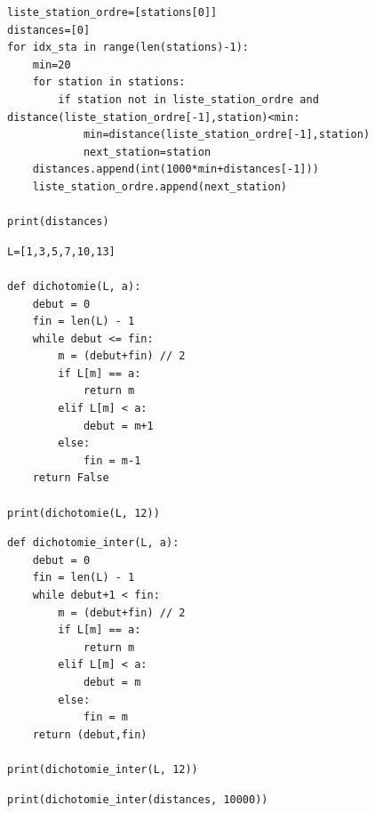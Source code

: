 \reponse{}

\begin{verbatim}
liste_station_ordre=[stations[0]]
distances=[0]
for idx_sta in range(len(stations)-1):
    min=20
    for station in stations:
        if station not in liste_station_ordre and distance(liste_station_ordre[-1],station)<min:
            min=distance(liste_station_ordre[-1],station)
            next_station=station
    distances.append(int(1000*min+distances[-1]))
    liste_station_ordre.append(next_station)

print(distances)
\end{verbatim}

\reponse{}

\begin{verbatim}
L=[1,3,5,7,10,13]

def dichotomie(L, a):
    debut = 0
    fin = len(L) - 1
    while debut <= fin:
        m = (debut+fin) // 2
        if L[m] == a:
            return m
        elif L[m] < a:
            debut = m+1
        else:
            fin = m-1
    return False

print(dichotomie(L, 12))
\end{verbatim}

\reponse{}

\begin{verbatim}
def dichotomie_inter(L, a):
    debut = 0
    fin = len(L) - 1
    while debut+1 < fin:
        m = (debut+fin) // 2
        if L[m] == a:
            return m
        elif L[m] < a:
            debut = m
        else:
            fin = m
    return (debut,fin)

print(dichotomie_inter(L, 12))
\end{verbatim}

\reponse{}

\begin{verbatim}
print(dichotomie_inter(distances, 10000))
\end{verbatim}

\reponse{}

